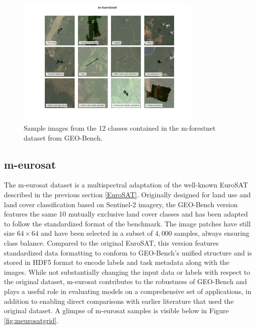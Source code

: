 \documentclass[a4paper, twoside, english]{sapthesis} %
\begin{document}
\begin{figure}[h]
    \centering
    \includegraphics[width=0.8\textwidth]{img/m-forestnet_image_grid.png}
    \caption{\normalsize Sample images from the 12 classes contained in the m-forestnet dataset from GEO-Bench.}
    \label{fig:forestnetgrid}
\end{figure}


\subsection{m-eurosat}

The m-eurosat dataset is a multispectral adaptation of the well-known EuroSAT \cite{helber2019eurosat} described in the previous section \ref{EuroSAT}. Originally designed for land use and land cover classification based on Sentinel-2 imagery, the GEO-Bench version features the same 10 mutually exclusive land cover classes and has been adapted to follow the standardized format of the benchmark. The image patches have still size $64 \times 64$ and have been selected in a subset of $4,000$ samples, always ensuring class balance. Compared to the original EuroSAT, this version features standardized data formatting to conform to GEO-Bench's unified structure and is stored in HDF5 format to encode labels and task metadata along with the images. While not substantially changing the input data or labels with respect to the original dataset, m-eurosat contributes to the robustness of GEO-Bench and plays a useful role in evaluating models on a comprehensive set of applications, in addition to enabling direct comparisons with earlier literature that used the original dataset. A glimpse of m-eurosat samples is visible below in Figure \ref{fig:meurosatgrid}.
\end{document}
